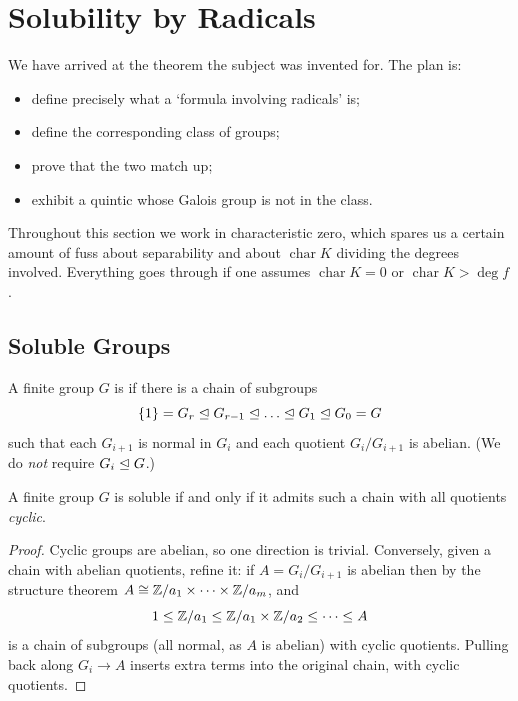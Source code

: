 \documentclass[a4paper]{scrartcl}
\newcommand{\charr}{\operatorname{char}}
\begin{document}
\section{Solubility by Radicals}\label{sec:soluble}

We have arrived at the theorem the subject was invented for. The plan is:
\begin{itemize}
	\item define precisely what a `formula involving radicals' is;
	\item define the corresponding class of groups;
	\item prove that the two match up;
	\item exhibit a quintic whose Galois group is not in the class.
\end{itemize}

Throughout this section we work in characteristic zero, which spares us a certain amount of fuss about separability and about $\charr K$ dividing the degrees involved. Everything goes through if one assumes $\charr K = 0$ or $\charr K > \deg f$.

\subsection{Soluble Groups}

\begin{definition}
	A finite group $G$ is  if there is a chain of subgroups
	$$\{1\} = G_r \normal G_{r-1}\normal \dots \normal G_1 \normal G_0 = G$$
	such that each $G_{i+1}$ is normal in $G_i$ and each quotient $G_i/G_{i+1}$ is abelian. (We do \emph{not} require $G_i \trianglelefteq G$.)
\end{definition}

\begin{lemma}\label{lem:solcyclic}
	A finite group $G$ is soluble if and only if it admits such a chain with all quotients \emph{cyclic}.
\end{lemma}

\begin{proof}
	Cyclic groups are abelian, so one direction is trivial. Conversely, given a chain with abelian quotients, refine it: if $A = G_i/G_{i+1}$ is abelian then by the structure theorem $A \cong \mathbb{Z}/a_1\times\dots\times\mathbb{Z}/a_m$, and
	$$1 \leq \mathbb{Z}/a_1 \leq \mathbb{Z}/a_1\times\mathbb{Z}/a_2\leq \dots \leq A$$
	is a chain of subgroups (all normal, as $A$ is abelian) with cyclic quotients. Pulling back along $G_i \to A$ inserts extra terms into the original chain, with cyclic quotients.
\end{proof}
\end{document}
